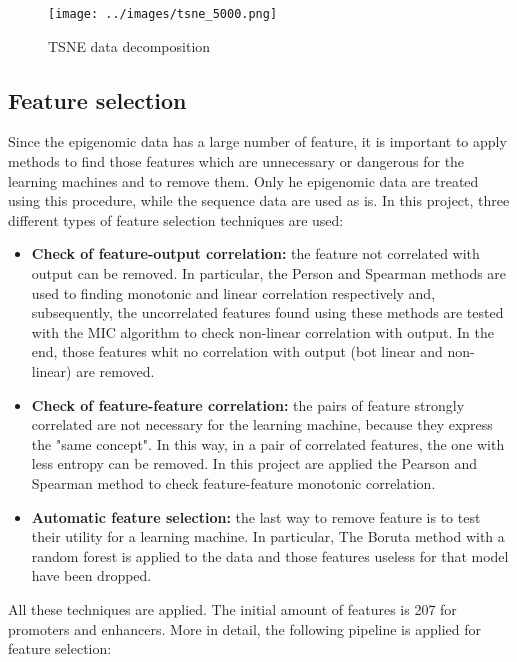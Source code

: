 \begin{figure}[h]
\centering
\texttt{[image: ../images/tsne\_5000.png]}
\caption{TSNE data decomposition}
\end{figure}
\newpage
\subsection{Feature selection}

Since the epigenomic data has a large number of feature, it is important
to apply methods to find those features which are unnecessary or
dangerous for the learning machines and to remove them. Only he
epigenomic data are treated using this procedure, while the sequence
data are used as is. In this project, three different types of feature
selection techniques are used:

\begin{itemize}
\item
  \textbf{Check of feature-output correlation:} the feature not
  correlated with output can be removed. In particular, the Person and
  Spearman methods are used to finding monotonic and linear correlation
  respectively and, subsequently, the uncorrelated features found using
  these methods are tested with the MIC algorithm to check non-linear
  correlation with output. In the end, those features whit no
  correlation with output (bot linear and non-linear) are removed. 
\item
  \textbf{Check of feature-feature correlation:} the pairs of feature
  strongly correlated are not necessary for the learning machine,
  because they express the "same concept". In this way, in a pair of
  correlated features, the one with less entropy can be removed. In this
  project are applied the Pearson and Spearman method to check
  feature-feature monotonic correlation.
\item
  \textbf{Automatic feature selection:} the last way to remove feature
  is to test their utility for a learning machine. In particular, The
  Boruta method with a random forest is applied to the data and those
  features useless for that model have been dropped.
\end{itemize}

All these techniques are applied. The initial amount of features is 207
for promoters and enhancers. More in detail, the following pipeline is
applied for feature selection:

